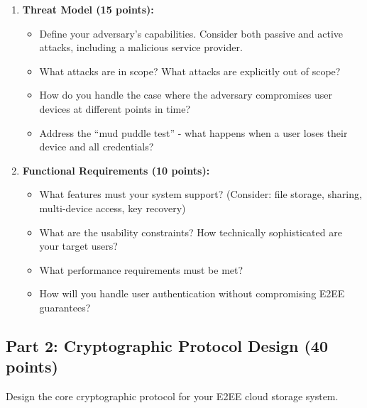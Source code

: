 \documentclass[10pt,a4paper,american]{exam}
\begin{document}
\begin{enumerate}
	\item \textbf{Threat Model (15 points):}
	      \begin{itemize}
		      \item Define your adversary's capabilities. Consider both passive and active attacks, including a malicious service provider.
		      \item What attacks are in scope? What attacks are explicitly out of scope?
		      \item How do you handle the case where the adversary compromises user devices at different points in time?
		      \item Address the ``mud puddle test'' - what happens when a user loses their device and all credentials?
	      \end{itemize}

	\item \textbf{Functional Requirements (10 points):}
	      \begin{itemize}
		      \item What features must your system support? (Consider: file storage, sharing, multi-device access, key recovery)
		      \item What are the usability constraints? How technically sophisticated are your target users?
		      \item What performance requirements must be met?
		      \item How will you handle user authentication without compromising E2EE guarantees?
	      \end{itemize}
\end{enumerate}

\subsection{Part 2: Cryptographic Protocol Design (40 points)}

Design the core cryptographic protocol for your E2EE cloud storage system.
\end{document}

